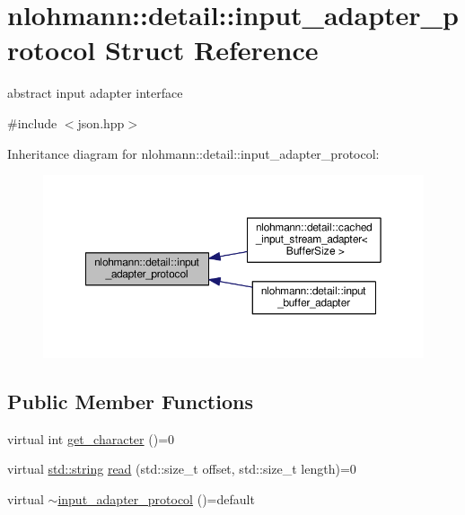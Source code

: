 \hypertarget{structnlohmann_1_1detail_1_1input__adapter__protocol}{}\section{nlohmann\+:\+:detail\+:\+:input\+\_\+adapter\+\_\+protocol Struct Reference}
\label{structnlohmann_1_1detail_1_1input__adapter__protocol}


abstract input adapter interface  




{\ttfamily \#include $<$json.\+hpp$>$}



Inheritance diagram for nlohmann\+:\+:detail\+:\+:input\+\_\+adapter\+\_\+protocol\+:\nopagebreak
\begin{figure}[H]
\begin{center}
\leavevmode
\includegraphics[width=350pt]{structnlohmann_1_1detail_1_1input__adapter__protocol__inherit__graph}
\end{center}
\end{figure}
\subsection*{Public Member Functions}
\begin{DoxyCompactItemize}
\item 
virtual int \hyperlink{structnlohmann_1_1detail_1_1input__adapter__protocol_af4e0baade0a6b45a73d4e136875e7544}{get\+\_\+character} ()=0
\item 
virtual \hyperlink{namespacenlohmann_1_1detail_a90aa5ef615aa8305e9ea20d8a947980fab45cffe084dd3d20d928bee85e7b0f21}{std\+::string} \hyperlink{structnlohmann_1_1detail_1_1input__adapter__protocol_a9ce6c8028229446d7014c0610fbd4599}{read} (std\+::size\+\_\+t offset, std\+::size\+\_\+t length)=0
\item 
virtual \hyperlink{structnlohmann_1_1detail_1_1input__adapter__protocol_a92dac74def4ac5adacd0684088bd4082}{$\sim$input\+\_\+adapter\+\_\+protocol} ()=default
\end{DoxyCompactItemize}


